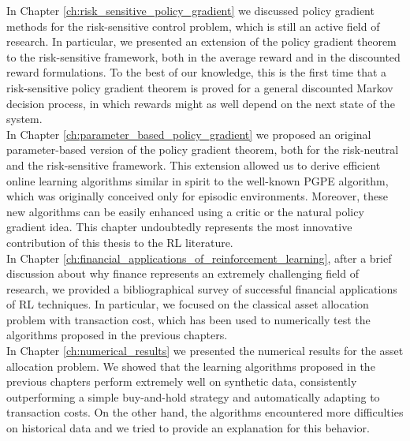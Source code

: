 In Chapter \ref{ch:risk_sensitive_policy_gradient} we discussed policy gradient methods for the risk-sensitive control problem, which is still an active field of research. In particular, we presented an extension of the policy gradient theorem to the risk-sensitive framework, both in the average reward and in the discounted reward formulations. To the best of our knowledge, this is the first time that a risk-sensitive policy gradient theorem is proved for a general discounted Markov decision process, in which rewards might as well depend on the next state of the system.\\
In Chapter \ref{ch:parameter_based_policy_gradient} we proposed an original parameter-based version of the policy gradient theorem, both for the risk-neutral and the risk-sensitive framework. This extension allowed us to derive efficient online learning algorithms similar in spirit to the well-known \gls{PGPE} algorithm, which was originally conceived only for episodic environments. Moreover, these new algorithms can be easily enhanced using a critic or the natural policy gradient idea. This chapter undoubtedly represents the most innovative contribution of this thesis to the \gls{RL} literature.\\ 
In Chapter \ref{ch:financial_applications_of_reinforcement_learning}, after a brief discussion about why finance represents an extremely challenging field of research, we provided a bibliographical survey of successful financial applications of \gls{RL} techniques. In particular, we focused on the classical asset allocation problem with transaction cost, which has been used to numerically test the algorithms proposed in the previous chapters.\\
In Chapter \ref{ch:numerical_results} we presented the numerical results for the asset allocation problem. We showed that the learning algorithms proposed in the previous chapters perform extremely well on synthetic data, consistently outperforming a simple buy-and-hold strategy and automatically adapting to transaction costs. On the other hand, the algorithms encountered more difficulties on historical data and we tried to provide an explanation for this behavior.\\

